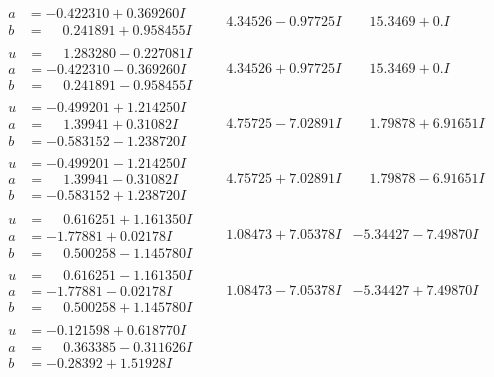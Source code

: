 \documentclass[1p]{elsarticle_modified}
\theoremstyle{definition}
\begin{document}
$$\begin{array}{c|c|c}
\begin{aligned}
a &= -0.422310 + 0.369260 I \\
b &= \phantom{-}0.241891 + 0.958455 I\end{aligned}
 & \phantom{-}4.34526 - 0.97725 I & \phantom{-}15.3469 + 0. I\phantom{ +0.000000I} \\ \hline\begin{aligned}
u &= \phantom{-}1.283280 - 0.227081 I \\
a &= -0.422310 - 0.369260 I \\
b &= \phantom{-}0.241891 - 0.958455 I\end{aligned}
 & \phantom{-}4.34526 + 0.97725 I & \phantom{-}15.3469 + 0. I\phantom{ +0.000000I} \\ \hline\begin{aligned}
u &= -0.499201 + 1.214250 I \\
a &= \phantom{-}1.39941 + 0.31082 I \\
b &= -0.583152 - 1.238720 I\end{aligned}
 & \phantom{-}4.75725 - 7.02891 I & \phantom{-}1.79878 + 6.91651 I \\ \hline\begin{aligned}
u &= -0.499201 - 1.214250 I \\
a &= \phantom{-}1.39941 - 0.31082 I \\
b &= -0.583152 + 1.238720 I\end{aligned}
 & \phantom{-}4.75725 + 7.02891 I & \phantom{-}1.79878 - 6.91651 I \\ \hline\begin{aligned}
u &= \phantom{-}0.616251 + 1.161350 I \\
a &= -1.77881 + 0.02178 I \\
b &= \phantom{-}0.500258 - 1.145780 I\end{aligned}
 & \phantom{-}1.08473 + 7.05378 I & -5.34427 - 7.49870 I \\ \hline\begin{aligned}
u &= \phantom{-}0.616251 - 1.161350 I \\
a &= -1.77881 - 0.02178 I \\
b &= \phantom{-}0.500258 + 1.145780 I\end{aligned}
 & \phantom{-}1.08473 - 7.05378 I & -5.34427 + 7.49870 I \\ \hline\begin{aligned}
u &= -0.121598 + 0.618770 I \\
a &= \phantom{-}0.363385 - 0.311626 I \\
b &= -0.28392 + 1.51928 I\end{aligned}

\end{array}$$
\end{document}
